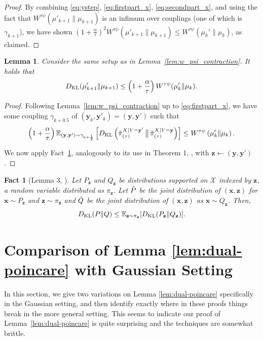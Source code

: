 \documentclass[11pt]{article}
\newtheorem{lemma}{Lemma}
\newtheorem{fact}{Fact}
\newcommand{\half}{\frac{1}{2}}
\newcommand{\E}{\mathbb{E}}
\newcommand{\Par}[1]{\left(#1\right)}
\newcommand{\Brack}[1]{\left[#1\right]}
\newcommand{\0}{\mathbf{0}}
\newcommand{\1}{\mathbf{1}}
\newcommand{\vx}{\mathbf{x}}
\newcommand{\vy}{\mathbf{y}}
\newcommand{\vz}{\mathbf{z}}
\newcommand{\calX}{\mathcal{X}}
\newcommand{\dkl}{D_{\textup{KL}}}
\newcommand{\tpi}{\tilde{\pi}}
\begin{document}
\begin{proof}
By combining \eqref{eq:ystep}, \eqref{eq:firstpart_x}, \eqref{eq:secondpart_x}, and using the fact that $W^{\tau\psi}(\mu'_{k + 1} \| \mu_{k + 1})$ is an infimum over couplings (one of which is $\gamma_{k + 1}$), we have shown $(1+\frac \alpha \tau)^2W^{\tau\psi}(\mu'_{k + 1} \| \mu_{k + 1}) \le W^{\tau\psi}(\mu_k' \| \mu_k)$, as claimed. 
\end{proof}


\begin{lemma}\label{lem:kl_le_w_psi}
    Consider the same setup as in Lemma~\ref{lem:w_psi_contraction}. It holds that \[
    \dkl(\mu_{k+1}'\|\mu_{k+1})\le \Par{1 + \frac \alpha \tau}W^{\tau\psi}(\mu_k'\|\mu_k).
    \]
\end{lemma}
\begin{proof}
Following Lemma~\ref{lem:w_psi_contraction} up to \eqref{eq:firstpart_x}, we have some coupling $\gamma_{k + 0.5}$ of $(\vy_k, \vy'_k) = (\vy, \vy')$ such that
\[\Par{1 + \frac \alpha \tau}\E_{(\vy, \vy') \sim \gamma_{k + \half}}\Brack{\dkl\Par{\tpi_{(\tau)}^{X \mid Y = \vy'} \,\big\|\, \tpi_{(\tau)}^{X \mid Y = \vy}}} \le W^{\tau\psi}\Par{\mu'_k \| \mu_k}.\]

    We now apply Fact~\ref{fact:lem3_lst21}, analogously to its use in Theorem 1, \cite{LeeST21}, with $\vz \gets (\vy, \vy')$.
\end{proof}


\begin{fact}[Lemma 3, \cite{LeeST21}]\label{fact:lem3_lst21}
    Let $P_\vz$ and $Q_\vz$ be distributions supported on $\calX$ indexed by $\vz$, a random variable distributed as $\pi_\vz$. Let $\Tilde{P}$ be the joint distribution of $(\vx,\vz)$ for $\vx\sim P_\vz$ and $\vz\sim\pi_\vz$ and $\Tilde{Q}$ be the joint distribution of $(\vx,\vz)$ as $\vx\sim Q_\vz$. Then, \[
    \dkl(P\|Q)\le \E_{\vz\sim\pi_\vz}[\dkl(P_\vz\|Q_\vz)].
    \]
\end{fact}


\section{Comparison of Lemma \ref{lem:dual-poincare} with Gaussian Setting}\label{sec:convexity}

In this section, we give two variations on Lemma \ref{lem:dual-poincare} specifically in the Gaussian setting, and then identify exactly where in these proofs things break in the more general setting. This seems to indicate our proof of Lemma~\ref{lem:dual-poincare} is quite surprising and the techniques are somewhat brittle.
\end{document}
